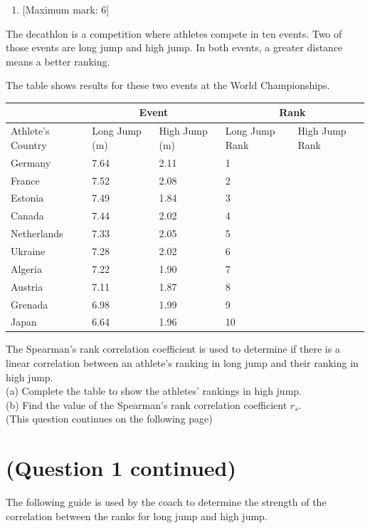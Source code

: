 \documentclass[10pt]{article}
\begin{document}
\begin{enumerate}
  \item \hspace{0pt} [Maximum mark: 6]
\end{enumerate}

The decathlon is a competition where athletes compete in ten events. Two of those events are long jump and high jump. In both events, a greater distance means a better ranking.

The table shows results for these two events at the World Championships.

\begin{center}
\begin{tabular}{|l|l|l|l|l|}
\hline
 & \multicolumn{2}{|c|}{Event} & \multicolumn{2}{|c|}{Rank} \\
\hline
Athlete's Country & Long Jump (m) & High Jump (m) & Long Jump Rank & High Jump Rank \\
\hline
Germany & 7.64 & 2.11 & 1 &  \\
\hline
France & 7.52 & 2.08 & 2 &  \\
\hline
Estonia & 7.49 & 1.84 & 3 &  \\
\hline
Canada & 7.44 & 2.02 & 4 &  \\
\hline
Netherlands & 7.33 & 2.05 & 5 &  \\
\hline
Ukraine & 7.28 & 2.02 & 6 &  \\
\hline
Algeria & 7.22 & 1.90 & 7 &  \\
\hline
Austria & 7.11 & 1.87 & 8 &  \\
\hline
Grenada & 6.98 & 1.99 & 9 &  \\
\hline
Japan & 6.64 & 1.96 & 10 &  \\
\hline
\end{tabular}
\end{center}

The Spearman's rank correlation coefficient is used to determine if there is a linear correlation between an athlete's ranking in long jump and their ranking in high jump.\\
(a) Complete the table to show the athletes' rankings in high jump.\\
(b) Find the value of the Spearman's rank correlation coefficient $r_{s}$.\\
(This question continues on the following page)

\section*{(Question 1 continued)}
The following guide is used by the coach to determine the strength of the correlation between the ranks for long jump and high jump.
\end{document}
